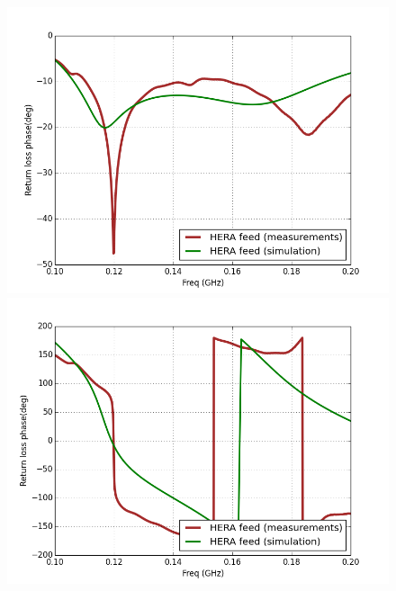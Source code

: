 \documentclass[twocolumn]{emulateapj}
\begin{document}
    \begin{figure}[ht]
    \begin{minipage}[b]{0.5\linewidth}
    \centering
    \includegraphics[angle=0, width=\linewidth]{GB_reflectometry_part3/plot/RL_mag_feed.png}
    \end{minipage}
    \hspace{0.1cm}
    \begin{minipage}[b]{0.5\linewidth}
    \centering
    \includegraphics[angle=0, width=\linewidth]{GB_reflectometry_part3/plot/RL_ph_feed.png}
    \end{minipage}
    \vspace{0.1cm}  
    \begin{minipage}[b]{0.5\linewidth}

\end{minipage}
\end{figure}
\end{document}
